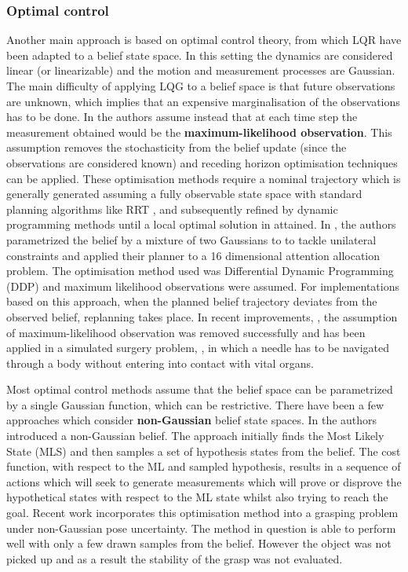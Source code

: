 \subsubsection{Optimal control}

Another main approach is based on optimal control theory, from which LQR have been adapted to a belief state space. 
In this setting the dynamics are considered linear (or linearizable) and the motion and measurement processes are Gaussian. The main difficulty of 
applying LQG to a belief space is that future observations are unknown, which implies that an expensive marginalisation of the observations has to be done. 
In \cite{bsp_rss_2010a} the authors assume instead that at each time step the measurement obtained would be the \textbf{maximum-likelihood observation}. 
This assumption removes the stochasticity from the belief update (since the observations are considered known) and receding horizon optimisation techniques 
can be applied. These optimisation methods require a nominal trajectory which is generally generated 
assuming a fully observable state space with standard planning algorithms like RRT \cite{LQG_MP_2011}, and subsequently refined by 
dynamic programming methods until a local optimal solution in attained. In \cite{Erez10ascalable}, the authors parametrized the belief by a mixture of two Gaussians to to tackle unilateral constraints
and applied their planner to a 16 dimensional attention allocation problem. The optimisation method used was Differential Dynamic Programming (DDP) and maximum likelihood 
observations were assumed. For implementations based on this approach, when the planned belief trajectory deviates from the observed belief, replanning takes place. 
In recent improvements, \cite{van_den_Berg_2012},  the assumption of maximum-likelihood observation was removed successfully
and has been applied in a simulated surgery problem, \cite{Needle_2014}, in which a needle has to be navigated through a body
without entering into contact with vital organs.

Most optimal control methods assume that the belief space can be parametrized by a single Gaussian function, which can be 
restrictive. There have been a few approaches which consider \textbf{non-Gaussian} belief state spaces.
In \cite{non_gauss_bel_plan_2012} the authors introduced a non-Gaussian belief. The approach initially finds the Most Likely State (MLS) 
and then samples a set of hypothesis states from the belief. The cost function, with respect to the ML and sampled hypothesis, results in a sequence of actions which will seek to generate measurements
which will prove or disprove the hypothetical states with respect to 
the ML state whilst also trying to reach the goal. Recent work \cite{seq_traj_replan_iros_2013} incorporates this optimisation method into a grasping problem under non-Gaussian pose
uncertainty. The method in question is able to perform well with only a few drawn samples from the belief. However the object was not picked up and as a result 
the stability of the grasp was not evaluated.  

